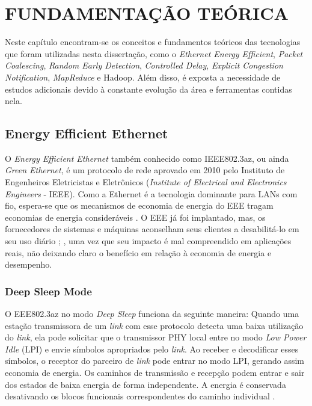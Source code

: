 \chapter{FUNDAMENTAÇÃO TEÓRICA}

Neste capítulo encontram-se os conceitos e fundamentos teóricos das tecnologias que foram utilizadas nesta dissertação, como o \emph{Ethernet Energy Efficient}, \emph{Packet Coalescing}, \emph{Random Early Detection}, \emph{Controlled Delay}, \emph{Explicit Congestion Notification}, \emph{MapReduce} e Hadoop. Além disso, é exposta a necessidade de estudos adicionais devido à constante evolução da área e ferramentas contidas nela.

\section{Energy Efficient Ethernet}

O \emph{Energy Efficient Ethernet} também conhecido como IEEE802.3az, ou ainda \emph{Green Ethernet}, é um protocolo de rede aprovado em 2010 pelo Instituto de Engenheiros Eletricistas e Eletrônicos (\emph{Institute of Electrical and Electronics Engineers} - IEEE). Como a Ethernet é a tecnologia dominante para LANs com fio, espera-se que os mecanismos de economia de energia do EEE tragam economias de energia consideráveis \cite{de2013performance}. O EEE já foi implantado, mas, os fornecedores de sistemas e máquinas aconselham seus clientes a desabilitá-lo em seu uso diário \cite{DellEEE}; \cite{ethernet2011ieee}, uma vez que seu impacto é mal compreendido em aplicações reais, não deixando claro o benefício em relação à economia de energia e desempenho.

\subsection{Deep Sleep Mode}

O EEE802.3az no modo \emph{Deep Sleep} funciona da seguinte maneira: Quando uma estação transmissora de um \emph{link} com esse protocolo detecta uma baixa utilização do \emph{link}, ela pode solicitar que o transmissor PHY local entre no modo \emph{Low Power Idle} (LPI) e envie símbolos apropriados pelo \emph{link}. Ao receber e decodificar esses símbolos, o receptor do parceiro de \emph{link} pode entrar no modo LPI, gerando assim economia de energia. Os caminhos de transmissão e recepção podem entrar e sair dos estados de baixa energia de forma independente. A energia é conservada desativando os blocos funcionais correspondentes do caminho individual \cite{5621025}.

